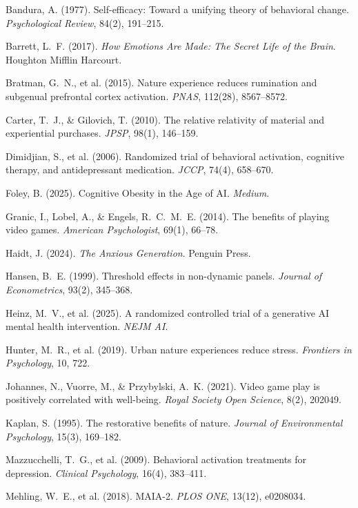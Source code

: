\documentclass[a4paper,11pt,titlepage]{article}
\begin{document}
\begin{enumerate}[label={[\arabic*]}, leftmargin=2em, itemsep=2pt]
  \item Bandura, A. (1977). Self-efficacy: Toward a unifying theory of behavioral change. \textit{Psychological Review}, 84(2), 191--215.
  \item Barrett, L.~F. (2017). \textit{How Emotions Are Made: The Secret Life of the Brain}. Houghton Mifflin Harcourt.
  \item Bratman, G.~N., et al. (2015). Nature experience reduces rumination and subgenual prefrontal cortex activation. \textit{PNAS}, 112(28), 8567--8572.
  \item Carter, T.~J., \& Gilovich, T. (2010). The relative relativity of material and experiential purchases. \textit{JPSP}, 98(1), 146--159.
  \item Dimidjian, S., et al. (2006). Randomized trial of behavioral activation, cognitive therapy, and antidepressant medication. \textit{JCCP}, 74(4), 658--670.
  \item Foley, B. (2025). Cognitive Obesity in the Age of AI. \textit{Medium}.
  \item Granic, I., Lobel, A., \& Engels, R.~C.~M.~E. (2014). The benefits of playing video games. \textit{American Psychologist}, 69(1), 66--78.
  \item Haidt, J. (2024). \textit{The Anxious Generation}. Penguin Press.
  \item Hansen, B.~E. (1999). Threshold effects in non-dynamic panels. \textit{Journal of Econometrics}, 93(2), 345--368.
  \item Heinz, M.~V., et al. (2025). A randomized controlled trial of a generative AI mental health intervention. \textit{NEJM AI}.
  \item Hunter, M.~R., et al. (2019). Urban nature experiences reduce stress. \textit{Frontiers in Psychology}, 10, 722.
  \item Johannes, N., Vuorre, M., \& Przybylski, A.~K. (2021). Video game play is positively correlated with well-being. \textit{Royal Society Open Science}, 8(2), 202049.
  \item Kaplan, S. (1995). The restorative benefits of nature. \textit{Journal of Environmental Psychology}, 15(3), 169--182.
  \item Mazzucchelli, T.~G., et al. (2009). Behavioral activation treatments for depression. \textit{Clinical Psychology}, 16(4), 383--411.
  \item Mehling, W.~E., et al. (2018). MAIA-2. \textit{PLOS ONE}, 13(12), e0208034.

\end{enumerate}
\end{document}
